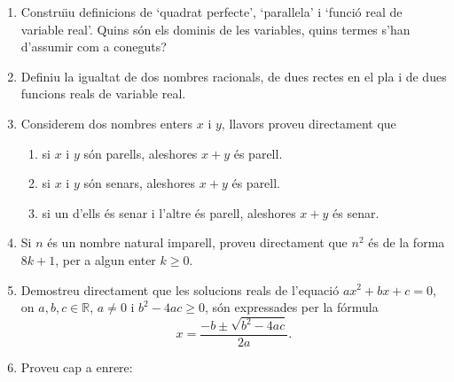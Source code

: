 \begin{enumerate}
\begin{enumerate}
\item Tots els peixos amb moltes espines no s\'{o}n agradables de menjar. Tots
els peixos amb moltes espines s\'{o}n peixos blancs. Per tant, tots els peixos
que siguin agradables de menjar no tenen moltes espines.

\item Tots els estudiants d'un institut de secund\`{a}ria que assisteixen a
classes d'ampliaci\'{o} s\'{o}n genials. Hi ha un estudiant de l'institut que
\'{e}s intel\textperiodcentered ligent i no \'{e}s genial. Per tant, hi ha un
estudiant de l'institut que \'{e}s intel\textperiodcentered ligent i no
assisteix a classes d'ampliaci\'{o}.
\end{enumerate}

\item Constru\"{\i}u definicions de `quadrat perfecte',
`paral\textperiodcentered lela' i `funci\'{o} real de variable real'. Quins
s\'{o}n els dominis de les variables, quins termes s'han d'assumir com a coneguts?

\item Definiu la igualtat de dos nombres racionals, de dues rectes en el pla i
de dues funcions reals de variable real.

\item Considerem dos nombres enters $x$ i $y$, llavors proveu directament que

\begin{enumerate}
\item si $x$ i $y$ s\'{o}n parells, aleshores $x+y$ \'{e}s parell.

\item si $x$ i $y$ s\'{o}n senars, aleshores $x+y$ \'{e}s parell.

\item si un d'ells \'{e}s senar i l'altre \'{e}s parell, aleshores $x+y$
\'{e}s senar.
\end{enumerate}

\item Si $n$ \'{e}s un nombre natural imparell, proveu directament que $n^{2}
$ \'{e}s de la forma $8k+1$, per a algun enter $k\geq0$.

\item Demostreu directament que les solucions reals de l'equaci\'{o} $ax^{2}+bx+c=0
$, on $a,b,c\in\mathbb{R}$, $a\neq0$ i $b^{2}-4ac\geq0$, s\'{o}n expressades per la
f\'{o}rmula
\[
x=\frac{-b\pm\sqrt{b^{2}-4ac}}{2a}.
\]


\item Proveu cap a enrere:


\end{enumerate}
